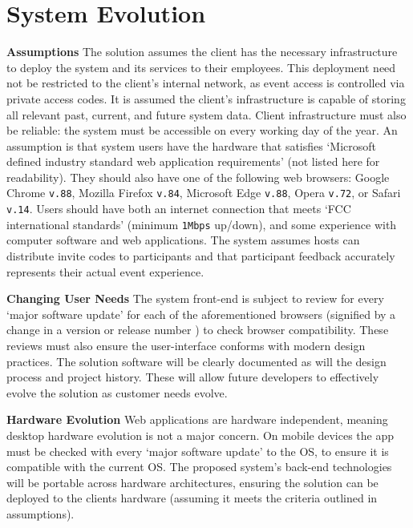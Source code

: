 \documentclass[9pt, titlepage]{extarticle}
\begin{document}
\section{System Evolution}
\textbf{Assumptions}\newline
The solution assumes the client has the necessary infrastructure to deploy the system and its services to their employees. 
This deployment need not be restricted to the client's internal network, as event access is controlled via private access codes. 
It is assumed the client's infrastructure is capable of storing all relevant past, current, and future system data. 
Client infrastructure must also be reliable: the system must be accessible on every working day of the year. 
An assumption is that system users have the hardware that satisfies `Microsoft defined industry standard web application requirements' \autocite{hardware} (not listed here for readability). They should also have one of the following web browsers: Google Chrome \texttt{v.88}, Mozilla Firefox \texttt{v.84}, Microsoft Edge \texttt{v.88}, Opera \texttt{v.72}, or Safari \texttt{v.14}. Users should have both an internet connection that meets `FCC international standards' \autocite{speed} (minimum \texttt{1Mbps} up/down), and some experience with computer software and web applications. The system assumes hosts can distribute invite codes to participants and that participant feedback accurately represents their actual event experience.\newline


\textbf{Changing User Needs}\newline
The system front-end is subject to review for every `major software update' for each of the aforementioned browsers (signified by a change in a version or release number \autocite{major}) to check browser compatibility. These reviews must also ensure the user-interface conforms with modern design practices. The solution software will be clearly documented as will the design process and project history. These will allow future developers to effectively evolve the solution as customer needs evolve.
\newline

\textbf{Hardware Evolution}\newline
Web applications are hardware independent, meaning desktop hardware evolution is not a major concern. On mobile devices the app must be checked with every `major software update' to the OS, to ensure it is compatible with the current OS. The proposed system's back-end technologies will be portable across hardware architectures, ensuring the solution can be deployed to the clients hardware (assuming it meets the criteria outlined in assumptions).
\end{document}
